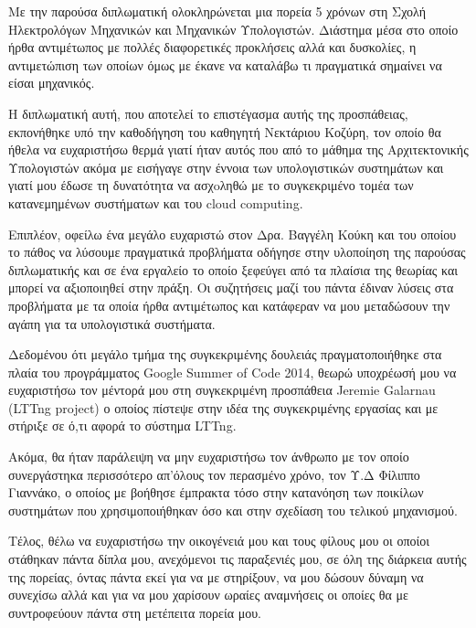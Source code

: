 \begin{acknowledgementsgr}
Με την παρούσα διπλωματική ολοκληρώνεται μια πορεία 5 χρόνων στη Σχολή
Ηλεκτρολόγων Μηχανικών και Μηχανικών Υπολογιστών. Διάστημα μέσα στο οποίο ήρθα
αντιμέτωπος με πολλές διαφορετικές προκλήσεις αλλά και δυσκολίες, η αντιμετώπιση
των οποίων όμως με έκανε να καταλάβω τι πραγματικά σημαίνει να είσαι μηχανικός.

Η διπλωματική αυτή, που αποτελεί το επιστέγασμα αυτής της προσπάθειας,
εκπονήθηκε υπό την καθοδήγηση του καθηγητή Νεκτάριου Κοζύρη, τον οποίο θα ήθελα
να ευχαριστήσω θερμά γιατί ήταν αυτός που από το μάθημα της Αρχιτεκτονικής
Υπολογιστών ακόμα με εισήγαγε στην έννοια των υπολογιστικών συστημάτων και γιατί
μου έδωσε τη δυνατότητα να ασχoληθώ με το συγκεκριμένο τομέα των κατανεμημένων
συστήματων και του cloud computing. 

Επιπλέον, οφείλω ένα μεγάλο ευχαριστώ στον Δρα. Βαγγέλη Κούκη και του οποίου το
πάθος να λύσουμε πραγματικά προβλήματα οδήγησε στην υλοποίηση της παρούσας
διπλωματικής και σε ένα εργαλείο το οποίο ξεφεύγει από τα πλαίσια της θεωρίας
και μπορεί να αξιοποιηθεί στην πράξη. Οι συζητήσεις μαζί του πάντα έδιναν λύσεις
στα προβλήματα με τα οποία ήρθα αντιμέτωπος και κατάφεραν να μου μεταδώσουν την
αγάπη για τα υπολογιστικά συστήματα.

Δεδομένου ότι μεγάλο τμήμα της συγκεκριμένης δουλειάς πραγματοποιήθηκε στα πλαία
του προγράμματος Google Summer of Code 2014, θεωρώ υποχρέωσή μου να ευχαριστήσω
τον μέντορά μου στη συγκεκριμένη προσπάθεια Jeremie Galarnau (LTTng project) ο
οποίος πίστεψε στην ιδέα της συγκεκριμένης εργασίας και με στήριξε σε ό,τι αφορά
το σύστημα LTTng.

Ακόμα, θα ήταν παράλειψη να μην ευχαριστήσω τον άνθρωπο με τον οποίο
συνεργάστηκα περισσότερο απ'όλους τον περασμένο χρόνο, τον Υ.Δ Φίλιππο Γιαννάκο,
ο οποίος με βοήθησε έμπρακτα τόσο στην κατανόηση των ποικίλων συστημάτων που
χρησιμοποιήθηκαν όσο και στην σχεδίαση του τελικού μηχανισμού.

Tέλος, θέλω να ευχαριστήσω την οικογένειά μου και τους φίλους μου οι οποίοι
στάθηκαν πάντα δίπλα μου, ανεχόμενοι τις παραξενιές μου, σε όλη της διάρκεια
αυτής της πορείας, όντας πάντα εκεί για να με στηρίξουν, να μου δώσουν δύναμη
να συνεχίσω αλλά και για να μου χαρίσουν ωραίες αναμνήσεις οι οποίες θα με
συντροφεύουν πάντα στη μετέπειτα πορεία μου.
\end{acknowledgementsgr}

